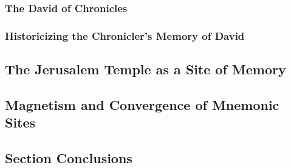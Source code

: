 \subsubsection{The David of Chronicles}

\subsubsection{Historicizing the Chronicler's Memory of David}

\subsection{The Jerusalem Temple as a Site of Memory}

\subsection{Magnetism and Convergence of Mnemonic Sites}

\subsection*{Section Conclusions}
